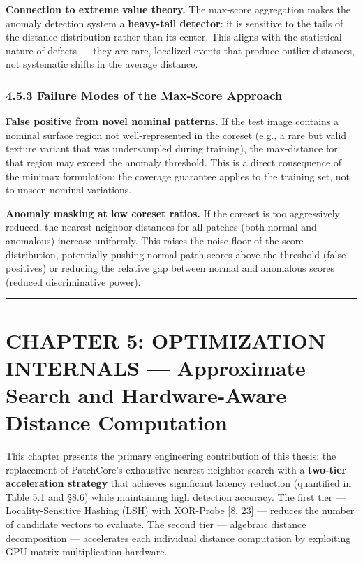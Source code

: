 \textbf{Connection to extreme value theory.} The max-score aggregation makes the anomaly detection system a \textbf{heavy-tail detector}: it is sensitive to the tails of the distance distribution rather than its center. This aligns with the statistical nature of defects --- they are rare, localized events that produce outlier distances, not systematic shifts in the average distance.

\subsubsection{4.5.3 Failure Modes of the Max-Score Approach}\label{failure-modes-of-the-max-score-approach}

\textbf{False positive from novel nominal patterns.} If the test image contains a nominal surface region not well-represented in the coreset (e.g., a rare but valid texture variant that was undersampled during training), the max-distance for that region may exceed the anomaly threshold. This is a direct consequence of the minimax formulation: the coverage guarantee applies to the training set, not to unseen nominal variations.

\textbf{Anomaly masking at low coreset ratios.} If the coreset is too aggressively reduced, the nearest-neighbor distances for all patches (both normal and anomalous) increase uniformly. This raises the noise floor of the score distribution, potentially pushing normal patch scores above the threshold (false positives) or reducing the relative gap between normal and anomalous scores (reduced discriminative power).

\begin{center}\rule{0.5\linewidth}{0.5pt}\end{center}

\section{CHAPTER 5: OPTIMIZATION INTERNALS --- Approximate Search and Hardware-Aware Distance Computation}\label{chapter-5-optimization-internals-approximate-search-and-hardware-aware-distance-computation}

This chapter presents the primary engineering contribution of this thesis: the replacement of PatchCore's exhaustive nearest-neighbor search with a \textbf{two-tier acceleration strategy} that achieves significant latency reduction (quantified in Table 5.1 and §8.6) while maintaining high detection accuracy. The first tier --- Locality-Sensitive Hashing (LSH) with XOR-Probe {[}8, 23{]} --- reduces the number of candidate vectors to evaluate. The second tier --- algebraic distance decomposition --- accelerates each individual distance computation by exploiting GPU matrix multiplication hardware.

